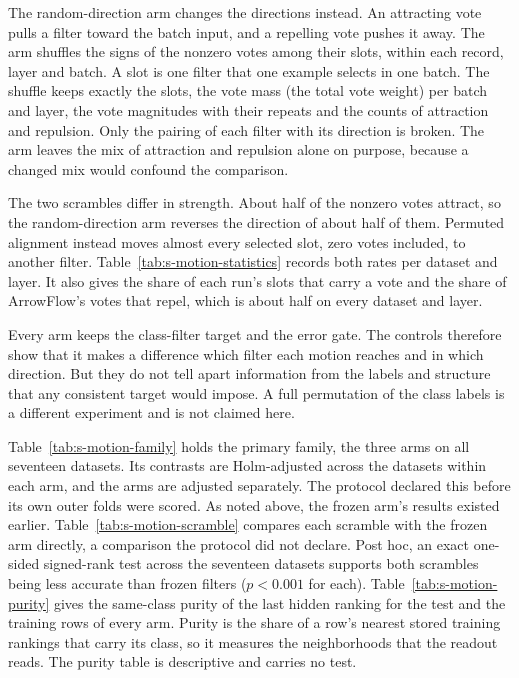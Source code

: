 The random-direction arm changes the directions instead. An attracting vote pulls a filter toward the batch input, and a repelling vote pushes it away. The arm shuffles the signs of the nonzero votes among their slots, within each record, layer and batch. A slot is one filter that one example selects in one batch. The shuffle keeps exactly the slots, the vote mass (the total vote weight) per batch and layer, the vote magnitudes with their repeats and the counts of attraction and repulsion. Only the pairing of each filter with its direction is broken. The arm leaves the mix of attraction and repulsion alone on purpose, because a changed mix would confound the comparison.

The two scrambles differ in strength. About half of the nonzero votes attract, so the random-direction arm reverses the direction of about half of them. Permuted alignment instead moves almost every selected slot, zero votes included, to another filter. Table~\ref{tab:s-motion-statistics} records both rates per dataset and layer. It also gives the share of each run's slots that carry a vote and the share of ArrowFlow's votes that repel, which is about half on every dataset and layer.

Every arm keeps the class-filter target and the error gate. The controls therefore show that it makes a difference which filter each motion reaches and in which direction. But they do not tell apart information from the labels and structure that any consistent target would impose. A full permutation of the class labels is a different experiment and is not claimed here.

Table~\ref{tab:s-motion-family} holds the primary family, the three arms on all seventeen datasets. Its contrasts are Holm-adjusted across the datasets within each arm, and the arms are adjusted separately. The protocol declared this before its own outer folds were scored. As noted above, the frozen arm's results existed earlier. Table~\ref{tab:s-motion-scramble} compares each scramble with the frozen arm directly, a comparison the protocol did not declare. Post hoc, an exact one-sided signed-rank test \citep{demsar2006statistical} across the seventeen datasets supports both scrambles being less accurate than frozen filters ($p<0.001$ for each). Table~\ref{tab:s-motion-purity} gives the same-class purity of the last hidden ranking for the test and the training rows of every arm. Purity is the share of a row's nearest stored training rankings that carry its class, so it measures the neighborhoods that the readout reads. The purity table is descriptive and carries no test.

